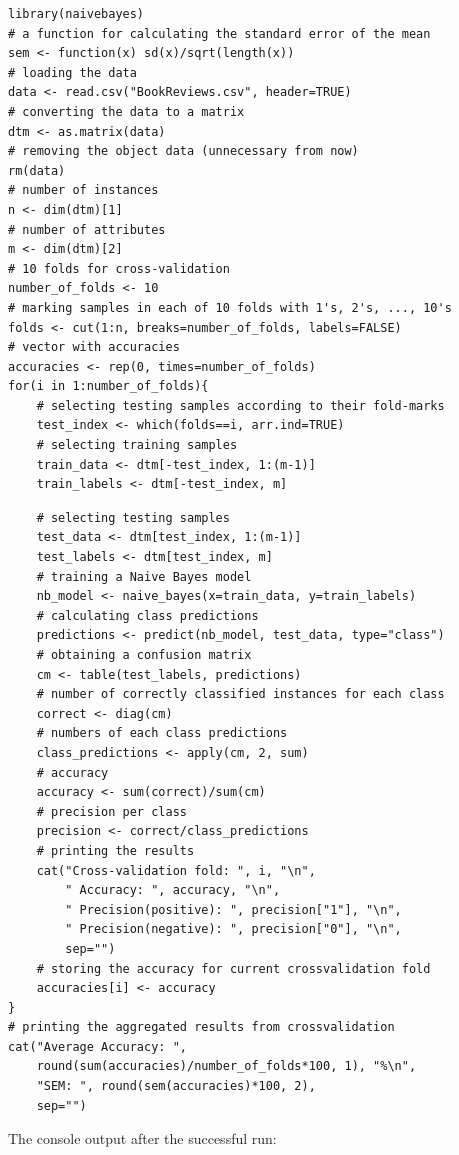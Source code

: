 \documentclass[11pt,openany,executivepaper]{book}
\begin{document}
\begin{verbatim}
library(naivebayes)
# a function for calculating the standard error of the mean
sem <- function(x) sd(x)/sqrt(length(x))
# loading the data
data <- read.csv("BookReviews.csv", header=TRUE)
# converting the data to a matrix
dtm <- as.matrix(data)
# removing the object data (unnecessary from now)
rm(data)
# number of instances
n <- dim(dtm)[1]
# number of attributes
m <- dim(dtm)[2]
# 10 folds for cross-validation
number_of_folds <- 10
# marking samples in each of 10 folds with 1's, 2's, ..., 10's
folds <- cut(1:n, breaks=number_of_folds, labels=FALSE)
# vector with accuracies
accuracies <- rep(0, times=number_of_folds)
for(i in 1:number_of_folds){
    # selecting testing samples according to their fold-marks
    test_index <- which(folds==i, arr.ind=TRUE)
    # selecting training samples
    train_data <- dtm[-test_index, 1:(m-1)]
    train_labels <- dtm[-test_index, m]
\end{verbatim}

\begin{verbatim}
    # selecting testing samples
    test_data <- dtm[test_index, 1:(m-1)]
    test_labels <- dtm[test_index, m]
    # training a Naive Bayes model
    nb_model <- naive_bayes(x=train_data, y=train_labels)
    # calculating class predictions
    predictions <- predict(nb_model, test_data, type="class")
    # obtaining a confusion matrix
    cm <- table(test_labels, predictions)
    # number of correctly classified instances for each class
    correct <- diag(cm)
    # numbers of each class predictions
    class_predictions <- apply(cm, 2, sum)
    # accuracy
    accuracy <- sum(correct)/sum(cm)
    # precision per class
    precision <- correct/class_predictions
    # printing the results
    cat("Cross-validation fold: ", i, "\n",
        " Accuracy: ", accuracy, "\n",
        " Precision(positive): ", precision["1"], "\n",
        " Precision(negative): ", precision["0"], "\n",
        sep="")
    # storing the accuracy for current crossvalidation fold
    accuracies[i] <- accuracy
}
# printing the aggregated results from crossvalidation
cat("Average Accuracy: ",
    round(sum(accuracies)/number_of_folds*100, 1), "%\n",
    "SEM: ", round(sem(accuracies)*100, 2),
    sep="")
\end{verbatim}

The console output after the successful run:
\end{document}
